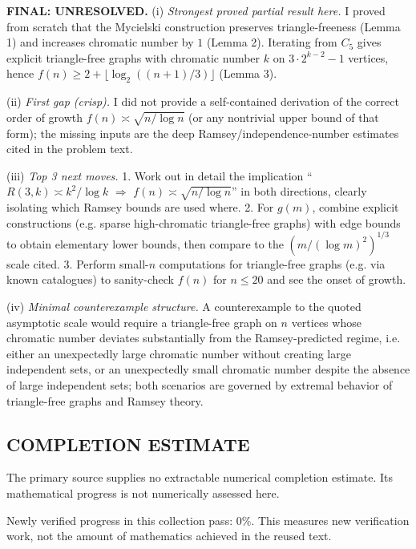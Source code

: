 \medskip
\noindent\textbf{FINAL: \textbf{UNRESOLVED}.}
(i) \emph{Strongest proved partial result here.} I proved from scratch that the Mycielski construction preserves triangle-freeness (Lemma 1) and increases chromatic number by $1$ (Lemma 2). Iterating from $C_5$ gives explicit triangle-free graphs with chromatic number $k$ on $3\cdot 2^{k-2}-1$ vertices, hence $f(n)\ge 2+\lfloor\log_2((n+1)/3)\rfloor$ (Lemma 3).

(ii) \emph{First gap (crisp).} I did not provide a self-contained derivation of the correct order of growth $f(n)\asymp \sqrt{n/\log n}$ (or any nontrivial upper bound of that form); the missing inputs are the deep Ramsey/independence-number estimates cited in the problem text.

(iii) \emph{Top 3 next moves.}
1. Work out in detail the implication ``$R(3,k)\asymp k^2/\log k$ $\Rightarrow$ $f(n)\asymp \sqrt{n/\log n}$'' in both directions, clearly isolating which Ramsey bounds are used where.
2. For $g(m)$, combine explicit constructions (e.g. sparse high-chromatic triangle-free graphs) with edge bounds to obtain elementary lower bounds, then compare to the $(m/(\log m)^2)^{1/3}$ scale cited.
3. Perform small-$n$ computations for triangle-free graphs (e.g. via known catalogues) to sanity-check $f(n)$ for $n\le 20$ and see the onset of growth.

(iv) \emph{Minimal counterexample structure.} A counterexample to the quoted asymptotic scale would require a triangle-free graph on $n$ vertices whose chromatic number deviates substantially from the Ramsey-predicted regime, i.e. either an unexpectedly large chromatic number without creating large independent sets, or an unexpectedly small chromatic number despite the absence of large independent sets; both scenarios are governed by extremal behavior of triangle-free graphs and Ramsey theory.


\subsection*{COMPLETION ESTIMATE}
The primary source supplies no extractable numerical completion estimate. Its mathematical progress is not numerically assessed here.

Newly verified progress in this collection pass: $0\%$. This measures new verification work, not the amount of mathematics achieved in the reused text.
